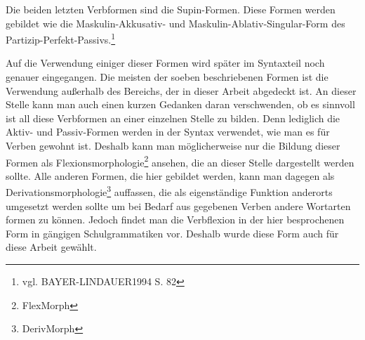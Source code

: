 \documentclass[12pt,abstract=on,titlepage,bibliography=totoc,ngerman,listof=totoc]{scrreprt}
\begin{document}
Die beiden letzten Verbformen sind die Supin-Formen. Diese Formen werden gebildet wie die Maskulin-Akkusativ- und Maskulin-Ablativ-Singular-Form des Partizip-Perfekt-Passivs.\footnote{vgl. BAYER-LINDAUER1994 S. 82} \par
Auf die Verwendung einiger dieser Formen wird später im Syntaxteil noch genauer eingegangen. Die meisten der soeben beschriebenen Formen ist die Verwendung außerhalb des Bereichs, der in dieser Arbeit abgedeckt ist. An dieser Stelle kann man auch einen kurzen Gedanken daran verschwenden, ob es sinnvoll ist all diese Verbformen an einer einzelnen Stelle zu bilden. Denn lediglich die Aktiv- und Passiv-Formen werden in der Syntax verwendet, wie man es für Verben gewohnt ist. Deshalb kann man möglicherweise nur die Bildung dieser Formen als Flexionsmorphologie\footnote{FlexMorph} ansehen, die an dieser Stelle dargestellt werden sollte. Alle anderen Formen, die hier gebildet werden, kann man dagegen als Derivationsmorphologie\footnote{DerivMorph} auffassen, die als eigenständige Funktion anderorts umgesetzt werden sollte um bei Bedarf aus gegebenen Verben andere Wortarten formen zu können. Jedoch findet man die Verbflexion in der hier besprochenen Form in gängigen Schulgrammatiken vor. Deshalb wurde diese Form auch für diese Arbeit gewählt. %
\end{document}
